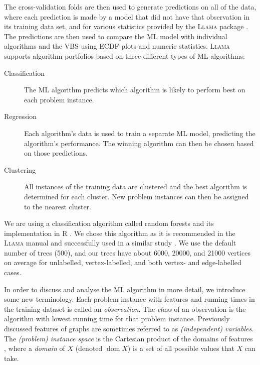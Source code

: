 \documentclass{l4proj}
\theoremstyle{definition}
\theoremstyle{remark}
\DeclareMathOperator{\dom}{dom}
\begin{document}
The cross-validation folds are then used to generate predictions on all of the
data, where each prediction is made by a model that did not have that observation
in its training data set, and for various statistics provided by the
\textsc{Llama} package \cite{llama}. The predictions are then used to compare
the ML model with individual algorithms and the VBS using ECDF plots and numeric
statistics. \textsc{Llama} \cite{kotthoff_llama_2013, llama} supports algorithm
portfolios based on three different types of ML algorithms:

\begin{description}
  \item[Classification] The ML algorithm predicts which algorithm is likely to
    perform best on each problem instance.
  \item[Regression] Each algorithm's data is used to train a separate ML model,
    predicting the algorithm's performance. The winning algorithm can then be
    chosen based on those predictions.
  \item[Clustering] All instances of the training data are clustered and the
    best algorithm is determined for each cluster. New problem instances can
    then be assigned to the nearest cluster.
\end{description}

We are using a classification algorithm called random forests
\cite{DBLP:journals/ml/Breiman01} and its implementation in R
\cite{randomforest}. We chose this algorithm as it is recommended in the
\textsc{Llama} manual \cite{kotthoff_llama_2013} and successfully used in a
similar study \cite{DBLP:conf/lion/KotthoffMS16}. We use the default number of
trees (500), and our trees have about \num{6000}, \num{20000}, and \num{21000}
vertices on average for unlabelled, vertex-labelled, and both vertex- and
edge-labelled cases.

In order to discuss and analyse the ML algorithm in more detail, we introduce
some new terminology. Each problem instance with features and running times in
the training dataset is called an \emph{observation}. The \emph{class} of an
observation is the algorithm with lowest running time for that problem instance.
Previously discussed features of graphs are sometimes referred to as
\emph{(independent) variables}. The \emph{(problem) instance space} is the
Cartesian product of the domains of features \cite{DBLP:series/smpai/RokachM14},
where a \emph{domain} of $X$ (denoted $\dom X$) is a set of all possible values
that $X$ can take.
\end{document}
